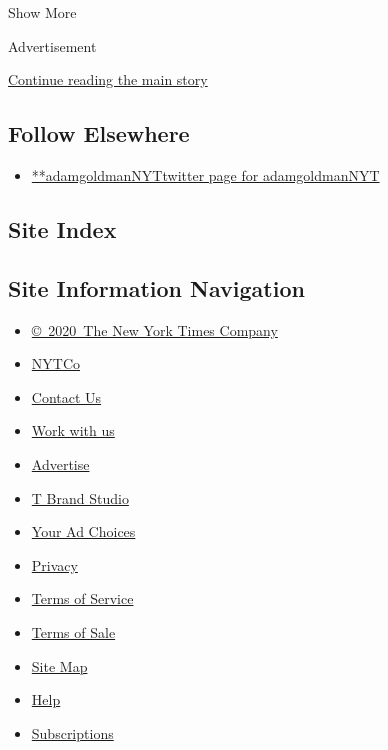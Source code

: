 Show More

Advertisement

\protect\hyperlink{after-mid2}{Continue reading the main story}

\hypertarget{follow-elsewhere}{%
\subsection{Follow Elsewhere}\label{follow-elsewhere}}

\begin{itemize}
\tightlist
\item
  \href{https://twitter.com/adamgoldmanNYT}{**adamgoldmanNYTtwitter page
  for adamgoldmanNYT}
\end{itemize}

\hypertarget{site-index}{%
\subsection{Site Index}\label{site-index}}

\hypertarget{site-information-navigation}{%
\subsection{Site Information
Navigation}\label{site-information-navigation}}

\begin{itemize}
\tightlist
\item
  \href{https://help.nytimes3xbfgragh.onion/hc/en-us/articles/115014792127-Copyright-notice}{©~2020~The
  New York Times Company}
\end{itemize}

\begin{itemize}
\tightlist
\item
  \href{https://www.nytco.com/}{NYTCo}
\item
  \href{https://help.nytimes3xbfgragh.onion/hc/en-us/articles/115015385887-Contact-Us}{Contact
  Us}
\item
  \href{https://www.nytco.com/careers/}{Work with us}
\item
  \href{https://nytmediakit.com/}{Advertise}
\item
  \href{http://www.tbrandstudio.com/}{T Brand Studio}
\item
  \href{https://www.nytimes3xbfgragh.onion/privacy/cookie-policy\#how-do-i-manage-trackers}{Your
  Ad Choices}
\item
  \href{https://www.nytimes3xbfgragh.onion/privacy}{Privacy}
\item
  \href{https://help.nytimes3xbfgragh.onion/hc/en-us/articles/115014893428-Terms-of-service}{Terms
  of Service}
\item
  \href{https://help.nytimes3xbfgragh.onion/hc/en-us/articles/115014893968-Terms-of-sale}{Terms
  of Sale}
\item
  \href{https://spiderbites.nytimes3xbfgragh.onion}{Site Map}
\item
  \href{https://help.nytimes3xbfgragh.onion/hc/en-us}{Help}
\item
  \href{https://www.nytimes3xbfgragh.onion/subscription?campaignId=37WXW}{Subscriptions}
\end{itemize}
